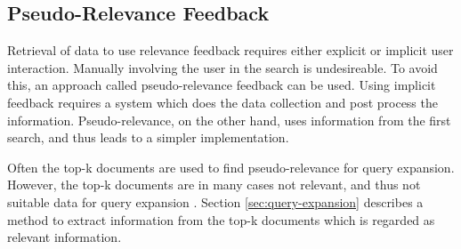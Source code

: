 \subsection{Pseudo-Relevance Feedback}
Retrieval of data to use relevance feedback requires either explicit or implicit user interaction.
Manually involving the user in the search is undesireable.
To avoid this, an approach called pseudo-relevance feedback can be used.
Using implicit feedback requires a system which does the data collection and post process the information.
Pseudo-relevance, on the other hand, uses information from the first search, and thus leads to a simpler implementation.

Often the top-k documents are used to find pseudo-relevance for query expansion.
However, the top-k documents are in many cases not relevant, and thus not suitable data for query expansion \cite{pseudo-relevance-invalid}.
Section \ref{sec:query-expansion} describes a method to extract information from the top-k documents which is regarded as relevant information.

